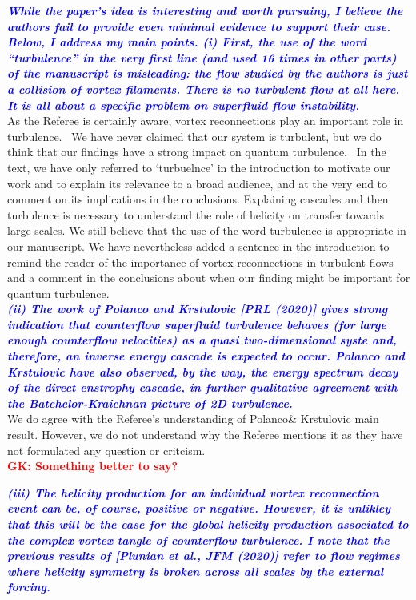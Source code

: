 \documentclass[a4paper,10pt]{article}
\def\red#1{\textcolor{red}{#1}}
\def\blue#1{\textcolor{blue}{#1}}
\def\refcomment#1{\textbf{\blue{\emph{#1}}}\\}
\begin{document}
\refcomment{While the paper’s idea is interesting and worth pursuing, I believe the authors fail to provide even minimal evidence to support their case. Below, I address my main points.
(i) First, the use of the word “turbulence” in the very first line (and used 16 times in other parts) of the manuscript is misleading: the flow studied by the authors is just a collision of vortex filaments. There is no turbulent flow at all here. It is all about a specific problem on superfluid flow instability.}

As the Referee is certainly aware, vortex reconnections play an important role in turbulence.  We have never claimed that our system is turbulent, but we do think that our findings have a strong impact on quantum turbulence.  In the text, we have only referred to `turbuelnce' in the introduction to motivate our work and to explain its relevance to a broad audience, and at the very end to comment on its implications in the conclusions. Explaining cascades and then turbulence is necessary to understand the role of helicity on transfer towards large scales. We still believe that the use of the word turbulence is appropriate in our manuscript. We have nevertheless added a sentence in the introduction to remind the reader of the importance of vortex reconnections in turbulent flows and a comment in the conclusions about when our finding might be important for quantum turbulence. \\

\refcomment{(ii) The work of Polanco and Krstulovic [PRL (2020)] gives strong indication that counterflow superfluid turbulence behaves (for large enough counterflow velocities) as a quasi two-dimensional syste and, therefore, an inverse energy cascade is expected to occur. Polanco and Krstulovic have also observed, by the way, the energy spectrum decay of the direct enstrophy cascade, in further qualitative agreement with the Batchelor-Kraichnan picture of 2D turbulence.}

We do agree with the Referee’s understanding of Polanco\& Krstulovic main result. However, we do not understand why the Referee mentions it as they have not formulated any question or critcism.\\

\red{\textbf{GK: Something better to say?}}

\refcomment{(iii) The helicity production for an individual vortex reconnection event can be, of course, positive or negative. However, it is unlikley that this will be the case for the global helicity production associated to the complex vortex tangle of counterflow turbulence. I note that the previous results of [Plunian et al., JFM (2020)] refer to flow regimes where helicity symmetry is broken across all scales by the external forcing.}
\end{document}
